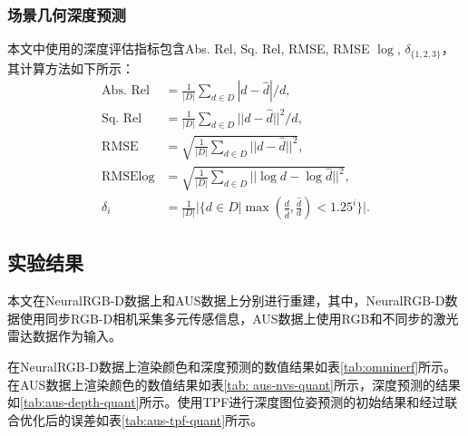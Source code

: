 \subsubsection{场景几何深度预测}
本文中使用的深度评估指标包含Abs. Rel, Sq. Rel, RMSE, RMSE $\log$, $\delta_{\{1,2,3\}}$，其计算方法如下所示：
\begin{align}
    \text{Abs. Rel} &= \frac{1}{|D|}\sum_{d\in D} |d - \hat{d}| / d,\\
    \text{Sq. Rel} &= \frac{1}{|D|}\sum_{d\in D} ||d - \hat{d}||^2 / d,\\
    \text{RMSE} &= \sqrt{\frac{1}{|D|}\sum_{d\in D} ||d - \hat{d}||^2},\\
    \text{RMSE} \log &= \sqrt{\frac{1}{|D|}\sum_{d\in D} ||\log d - \log\hat{d}||^2},\\
    \delta_i &= \frac{1}{|D|}|\{d\in D | \max(\frac{d}{\hat{d}}, \frac{\hat{d}}{d}) < 1.25^i\}|.
\end{align}

\subsection{实验结果}
本文在NeuralRGB-D数据上和AUS数据上分别进行重建，其中，NeuralRGB-D数据使用同步RGB-D相机采集多元传感信息，AUS数据上使用RGB和不同步的激光雷达数据作为输入。

在NeuralRGB-D数据上渲染颜色和深度预测的数值结果如表\ref{tab:omninerf}所示。在AUS数据上渲染颜色的数值结果如表\ref{tab: aus-nvs-quant}所示，深度预测的结果如\ref{tab:aus-depth-quant}所示。使用TPF进行深度图位姿预测的初始结果和经过联合优化后的误差如表\ref{tab:aus-tpf-quant}所示。

\begin{table}[ht]
\centering
{}
\caption{在NeuralRGB-D数据上评估渲染颜色和深度的数值结果}
\label{tab:omninerf}
\end{table}

